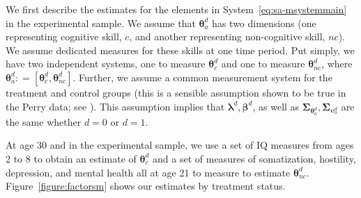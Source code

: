 \noindent We first describe the estimates for the elements in System~\eqref{eq:sa-msystemmain} in the experimental sample. We assume that $\bm{\theta}_{a}^d$ has two dimensions (one representing cognitive skill, $c$, and another representing non-cognitive skill, $nc$). We assume dedicated measures for these skills at one time period. Put simply, we have two independent systems, one to measure $\bm{\theta}_{c}^d$ and one to measure $\bm{\theta}_{nc}^d$, where $\bm{\theta}_{a}^d: = \left[ \bm{\theta}_{c}^d, \bm{\theta}_{nc}^d \right]$. Further, we assume a common measurement system for the treatment and control groups (this is a sensible assumption shown to be true in the Perry data; see \citealp{Heckman_Pinto_etal_2013_PerryFactor}). This assumption implies that $\bm{\lambda}^d, \bm{\beta}^d$, as well as $\bm{\Sigma}_{\bm{\theta}_{a}^d}, \bm{\Sigma}_{\bm{\upsilon}_{a}^d}$ are the same whether $d = 0$ or $d = 1$.

\noindent At age 30 and in the experimental sample, we use a set of IQ measures from ages 2 to 8 to obtain an estimate of $\bm{\theta}_{c}^d$ and a set of measures of somatization, hostility, depression, and mental health all at age 21 to measure to estimate $\bm{\theta}_{nc}^d$. Figure~\ref{figure:factorsm} shows our estimates by treatment status.

